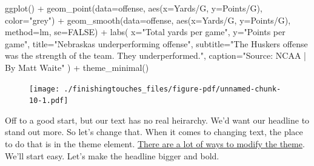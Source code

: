 \documentclass[
  letterpaper,
  DIV=11,
  numbers=noendperiod]{scrreprt}
\newenvironment{Shaded}{\begin{snugshade}}{\end{snugshade}}
\newcommand{\AttributeTok}[1]{\textcolor[rgb]{0.40,0.45,0.13}{#1}}
\newcommand{\ConstantTok}[1]{\textcolor[rgb]{0.56,0.35,0.01}{#1}}
\newcommand{\FunctionTok}[1]{\textcolor[rgb]{0.28,0.35,0.67}{#1}}
\newcommand{\NormalTok}[1]{\textcolor[rgb]{0.00,0.23,0.31}{#1}}
\newcommand{\SpecialCharTok}[1]{\textcolor[rgb]{0.37,0.37,0.37}{#1}}
\newcommand{\StringTok}[1]{\textcolor[rgb]{0.13,0.47,0.30}{#1}}
\begin{document}
\begin{Shaded}
\begin{Highlighting}[]
\FunctionTok{ggplot}\NormalTok{() }\SpecialCharTok{+} 
  \FunctionTok{geom\_point}\NormalTok{(}\AttributeTok{data=}\NormalTok{offense, }\FunctionTok{aes}\NormalTok{(}\AttributeTok{x=}\StringTok{\textasciigrave{}}\AttributeTok{Yards/G}\StringTok{\textasciigrave{}}\NormalTok{, }\AttributeTok{y=}\StringTok{\textasciigrave{}}\AttributeTok{Points/G}\StringTok{\textasciigrave{}}\NormalTok{), }\AttributeTok{color=}\StringTok{"grey"}\NormalTok{) }\SpecialCharTok{+} 
  \FunctionTok{geom\_smooth}\NormalTok{(}\AttributeTok{data=}\NormalTok{offense, }\FunctionTok{aes}\NormalTok{(}\AttributeTok{x=}\StringTok{\textasciigrave{}}\AttributeTok{Yards/G}\StringTok{\textasciigrave{}}\NormalTok{, }\AttributeTok{y=}\StringTok{\textasciigrave{}}\AttributeTok{Points/G}\StringTok{\textasciigrave{}}\NormalTok{), }\AttributeTok{method=}\NormalTok{lm, }\AttributeTok{se=}\ConstantTok{FALSE}\NormalTok{) }\SpecialCharTok{+} 
  \FunctionTok{labs}\NormalTok{(}
    \AttributeTok{x=}\StringTok{"Total yards per game"}\NormalTok{, }
    \AttributeTok{y=}\StringTok{"Points per game"}\NormalTok{, }
    \AttributeTok{title=}\StringTok{"Nebraska\textquotesingle{}s underperforming offense"}\NormalTok{, }
    \AttributeTok{subtitle=}\StringTok{"The Husker\textquotesingle{}s offense was the strength of the team. They underperformed."}\NormalTok{,}
    \AttributeTok{caption=}\StringTok{"Source: NCAA | By Matt Waite"}
\NormalTok{    ) }\SpecialCharTok{+} 
  \FunctionTok{theme\_minimal}\NormalTok{()}
\end{Highlighting}
\end{Shaded}

\begin{figure}[H]

{\centering \texttt{[image: ./finishingtouches\_files/figure-pdf/unnamed-chunk-10-1.pdf]}

}

\end{figure}

Off to a good start, but our text has no real heirarchy. We'd want our
headline to stand out more. So let's change that. When it comes to
changing text, the place to do that is in the theme element.
\href{http://ggplot2.tidyverse.org/reference/theme.html}{There are a lot
of ways to modify the theme}. We'll start easy. Let's make the headline
bigger and bold.
\end{document}
